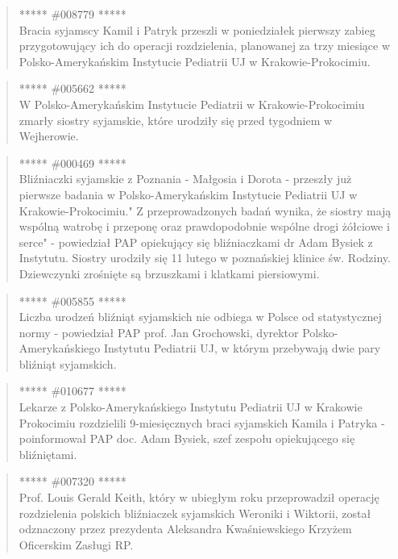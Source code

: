 \documentclass[11pt,a4paper]{article}
\begin{document}
\begin{quote} ***** \#008779 *****\\ Bracia syjamscy Kamil i Patryk przeszli w
poniedziałek pierwszy zabieg przygotowujący ich do operacji rozdzielenia,
planowanej za trzy miesiące w Polsko-Amerykańskim  Instytucie Pediatrii UJ w
Krakowie-Prokocimiu.  \end{quote}

\begin{quote} ***** \#005662 *****\\ W Polsko-Amerykańskim Instytucie Pediatrii w
Krakowie-Prokocimiu zmarły siostry syjamskie, które urodziły się przed
tygodniem w Wejherowie.  \end{quote}

\begin{quote} ***** \#000469 *****\\ Bliźniaczki syjamskie z Poznania - Małgosia i
Dorota - przeszły już pierwsze badania w Polsko-Amerykańskim Instytucie
Pediatrii UJ w Krakowie-Prokocimiu." Z przeprowadzonych badań wynika, że
siostry mają wspólną watrobę i przeponę oraz prawdopodobnie wspólne drogi
żółciowe i serce" - powiedział PAP opiekujący się bliźniaczkami dr Adam Bysiek
z Instytutu. Siostry urodziły się 11 lutego w poznańskiej klinice św. Rodziny.
Dziewczynki zrośnięte są brzuszkami i klatkami piersiowymi.  \end{quote}

\begin{quote} ***** \#005855 *****\\ Liczba urodzeń bliźniąt syjamskich nie
odbiega w Polsce od statystycznej normy - powiedział PAP prof. Jan Grochowski,
dyrektor Polsko-Amerykańskiego Instytutu Pediatrii UJ, w którym przebywają dwie
pary bliźniąt syjamskich.  \end{quote}

\begin{quote} ***** \#010677 *****\\ Lekarze z Polsko-Amerykańskiego Instytutu
Pediatrii UJ w Krakowie Prokocimiu rozdzielili 9-miesięcznych braci syjamskich
Kamila i Patryka - poinformował PAP doc. Adam Bysiek, szef zespołu opiekującego
się bliźniętami.  \end{quote}

\begin{quote} ***** \#007320 *****\\ Prof. Louis Gerald Keith, który w ubiegłym
roku przeprowadził operację rozdzielenia polskich bliźniaczek syjamskich
Weroniki i Wiktorii, został odznaczony przez prezydenta Aleksandra
Kwaśniewskiego Krzyżem Oficerskim Zasługi RP.  \end{quote}
\end{document}
